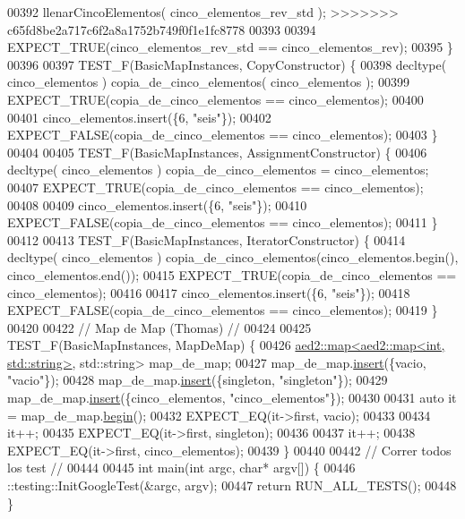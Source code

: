 \begin{DoxyCode}
00392     llenarCincoElementos( cinco\_elementos\_rev\_std );
>>>>>>> c65fd8be2a717c6f2a8a1752b749f0f1e1fc8778
00393 
00394     EXPECT\_TRUE(cinco\_elementos\_rev\_std == cinco\_elementos\_rev);
00395 \}
00396 
00397 TEST\_F(BasicMapInstances, CopyConstructor) \{
00398     decltype( cinco\_elementos ) copia\_de\_cinco\_elementos( cinco\_elementos );
00399     EXPECT\_TRUE(copia\_de\_cinco\_elementos == cinco\_elementos);
00400 
00401     cinco\_elementos.insert(\{6, \textcolor{stringliteral}{"seis"}\});
00402     EXPECT\_FALSE(copia\_de\_cinco\_elementos == cinco\_elementos);
00403 \}
00404 
00405 TEST\_F(BasicMapInstances, AssignmentConstructor) \{
00406     decltype( cinco\_elementos ) copia\_de\_cinco\_elementos = cinco\_elementos;
00407     EXPECT\_TRUE(copia\_de\_cinco\_elementos == cinco\_elementos);
00408 
00409     cinco\_elementos.insert(\{6, \textcolor{stringliteral}{"seis"}\});
00410     EXPECT\_FALSE(copia\_de\_cinco\_elementos == cinco\_elementos);
00411 \}
00412 
00413 TEST\_F(BasicMapInstances, IteratorConstructor) \{
00414     decltype( cinco\_elementos ) copia\_de\_cinco\_elementos(cinco\_elementos.begin(), cinco\_elementos.end());
00415     EXPECT\_TRUE(copia\_de\_cinco\_elementos == cinco\_elementos);
00416 
00417     cinco\_elementos.insert(\{6, \textcolor{stringliteral}{"seis"}\});
00418     EXPECT\_FALSE(copia\_de\_cinco\_elementos == cinco\_elementos);
00419 \}
00420 
00422 \textcolor{comment}{// Map de Map (Thomas) //}
00424 \textcolor{comment}{}
00425 TEST\_F(BasicMapInstances, MapDeMap) \{
00426     \hyperlink{classaed2_1_1map}{aed2::map<aed2::map<int, std::string>}, std::string> map\_de\_map;
00427     map\_de\_map.\hyperlink{classaed2_1_1map_a60aacba06b1579630b3c8e996cf248c8_a60aacba06b1579630b3c8e996cf248c8}{insert}(\{vacio, \textcolor{stringliteral}{"vacio"}\});
00428     map\_de\_map.\hyperlink{classaed2_1_1map_a60aacba06b1579630b3c8e996cf248c8_a60aacba06b1579630b3c8e996cf248c8}{insert}(\{singleton, \textcolor{stringliteral}{"singleton"}\});
00429     map\_de\_map.\hyperlink{classaed2_1_1map_a60aacba06b1579630b3c8e996cf248c8_a60aacba06b1579630b3c8e996cf248c8}{insert}(\{cinco\_elementos, \textcolor{stringliteral}{"cinco\_elementos"}\});
00430 
00431     \textcolor{keyword}{auto} it = map\_de\_map.\hyperlink{classaed2_1_1map_a58a95705d54b3dda7f775ce5a22225cb_a58a95705d54b3dda7f775ce5a22225cb}{begin}();
00432     EXPECT\_EQ(it->first, vacio);
00433 
00434     it++;
00435     EXPECT\_EQ(it->first, singleton);
00436 
00437     it++;
00438     EXPECT\_EQ(it->first, cinco\_elementos);
00439 \}
00440 
00442 \textcolor{comment}{// Correr todos los test //}
00444 \textcolor{comment}{}
00445 \textcolor{keywordtype}{int} main(\textcolor{keywordtype}{int} argc, \textcolor{keywordtype}{char}* argv[]) \{
00446     ::testing::InitGoogleTest(&argc, argv);
00447   \textcolor{keywordflow}{return} RUN\_ALL\_TESTS();
00448 \}
\end{DoxyCode}
